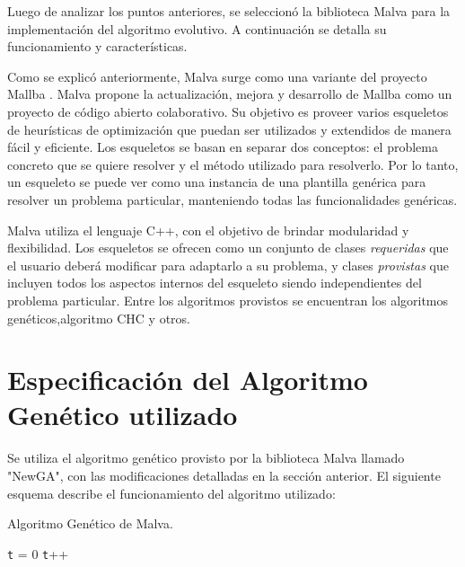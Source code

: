 Luego de analizar los puntos anteriores, se seleccionó la biblioteca Malva para la implementación del algoritmo evolutivo. A continuación se detalla su funcionamiento y características.

Como se explicó anteriormente, Malva \citep {Malva} surge como una variante del proyecto Mallba \citep{Mallba}. Malva propone la actualización, mejora y desarrollo de Mallba como un proyecto de código abierto colaborativo.  Su objetivo es proveer varios esqueletos de heurísticas de optimización que puedan ser utilizados y extendidos de manera fácil y eficiente. Los esqueletos se basan en separar dos conceptos: el problema concreto que se quiere resolver y el método utilizado para resolverlo. Por lo tanto, un esqueleto se puede ver como una instancia de una plantilla genérica para resolver un problema particular, manteniendo todas las funcionalidades genéricas.

Malva utiliza el lenguaje C++, con el objetivo de brindar modularidad y flexibilidad. Los esqueletos se ofrecen como un conjunto de clases \emph{requeridas} que el usuario deberá modificar para adaptarlo a su problema, y clases \emph{provistas} que incluyen todos los aspectos internos del esqueleto siendo  independientes del problema particular. Entre los algoritmos provistos se encuentran los algoritmos genéticos,algoritmo  CHC \citep{CHC} y otros.


\section{Especificación del Algoritmo Genético utilizado}
Se utiliza el algoritmo genético provisto por la biblioteca  Malva llamado "NewGA", con las modificaciones detalladas en la sección anterior. El siguiente esquema describe el funcionamiento del algoritmo utilizado:

\begin{algorithm}[H]
	\caption{Algoritmo Genético de Malva. }
	\label{alg:algoritmo_genetico_malva}
	\begin{algorithmic} [1] 
		{
			\STATE \texttt{t} = 0
			\STATE \texttt{t}++		
			\ENDWHILE
		}
	\end{algorithmic}
	
\end{algorithm}

